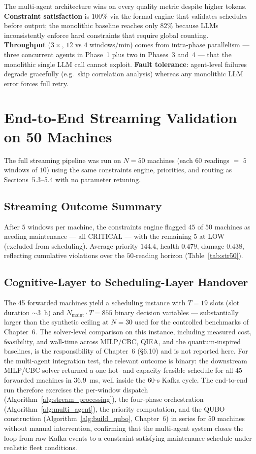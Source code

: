 \FloatBarrier
The multi-agent architecture wins on every quality metric despite higher tokens. \textbf{Constraint satisfaction} is $100\%$ via the formal engine that validates schedules before output; the monolithic baseline reaches only $82\%$ because LLMs inconsistently enforce hard constraints \cite{liu} that require global counting. \textbf{Throughput} ($3\times$, $12$ vs $4$ windows/min) comes from intra-phase parallelism — three concurrent agents in Phase~1 plus two in Phases~3 and~4 — that the monolithic single LLM call cannot exploit. \textbf{Fault tolerance}: agent-level failures degrade gracefully (e.g.\ skip correlation analysis) whereas any monolithic LLM error forces full retry.

\section{End-to-End Streaming Validation on 50 Machines}
The full streaming pipeline was run on $N=50$ machines (each $60$ readings $=$ $5$ windows of $10$) using the same constraints engine, priorities, and routing as Sections~5.3--5.4 with no parameter retuning.

\subsection{Streaming Outcome Summary}
After $5$ windows per machine, the constraints engine flagged $45$ of $50$ machines as needing maintenance — all CRITICAL — with the remaining $5$ at LOW (excluded from scheduling). Average priority $144.4$, health $0.479$, damage $0.438$, reflecting cumulative violations over the $50$-reading horizon (Table~\ref{tab:str50}).


\subsection{Cognitive-Layer to Scheduling-Layer Handover}
The 45 forwarded machines yield a scheduling instance with $T=19$ slots (slot duration $\sim 3$~h) and $N_{\text{maint}} \cdot T = 855$ binary decision variables — substantially larger than the synthetic ceiling at $N=30$ used for the controlled benchmarks of Chapter~6. The solver-level comparison on this instance, including measured cost, feasibility, and wall-time across MILP/CBC, QIEA, and the quantum-inspired baselines, is the responsibility of Chapter~6 (\S6.10) and is not reported here. For the multi-agent integration test, the relevant outcome is binary: the downstream MILP/CBC solver returned a one-hot- and capacity-feasible schedule for all $45$ forwarded machines in $36.9$~ms, well inside the $60$-s Kafka cycle. The end-to-end run therefore exercises the per-window dispatch (Algorithm~\ref{alg:stream_processing}), the four-phase orchestration (Algorithm~\ref{alg:multi_agent}), the priority computation, and the QUBO construction (Algorithm~\ref{alg:build_qubo}, Chapter~6) in series for $50$ machines without manual intervention, confirming that the multi-agent system closes the loop from raw Kafka events to a constraint-satisfying maintenance schedule under realistic fleet conditions.


